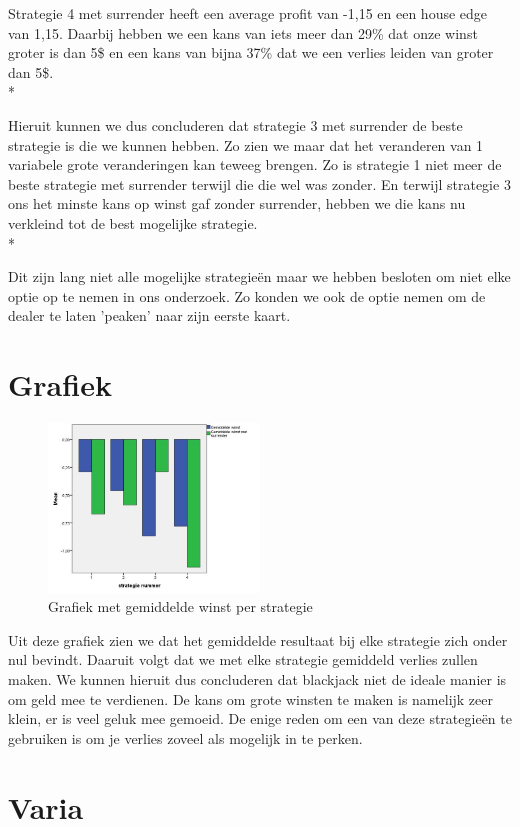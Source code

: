 \documentclass[conference]{IEEEtran}
\begin{document}
Strategie 4 met surrender heeft een average profit van -1,15 en een house edge van 1,15. Daarbij hebben we een kans van iets meer dan 29\% dat onze winst groter is dan 5\$ en een kans van bijna 37\% dat we een verlies leiden van groter dan 5\$. \\*
 
Hieruit kunnen we dus concluderen dat strategie 3 met surrender de beste strategie is die we kunnen hebben. Zo zien we maar dat het veranderen van 1 variabele grote veranderingen kan teweeg brengen. Zo is strategie 1 niet meer de beste strategie met surrender terwijl die die wel was zonder. En terwijl strategie 3 ons het minste kans op winst gaf zonder surrender, hebben we die kans nu verkleind tot de best mogelijke strategie.\\*

Dit zijn lang niet alle mogelijke strategie\"en maar we hebben besloten om niet elke optie op te nemen in ons onderzoek. Zo konden we ook de optie nemen om de dealer te laten 'peaken' naar zijn eerste kaart.

\section{Grafiek}

\begin{figure}[h!]
	\centering
		\includegraphics[width=0.5\textwidth]{GrafiekProfit.jpeg}
	\caption{Grafiek met gemiddelde winst per strategie}
	\label{fig:GrafiekProfit}
\end{figure}

Uit deze grafiek zien we dat het gemiddelde resultaat bij elke strategie zich onder nul bevindt. Daaruit volgt dat we met elke strategie gemiddeld verlies zullen maken. We kunnen hieruit dus concluderen dat blackjack niet de ideale manier is om geld mee te verdienen. De kans om grote winsten te maken is namelijk zeer klein, er is veel geluk mee gemoeid. De enige reden om een van deze strategie\"en te gebruiken is om je verlies zoveel als mogelijk in te perken.

\section{Varia}




\end{document}
